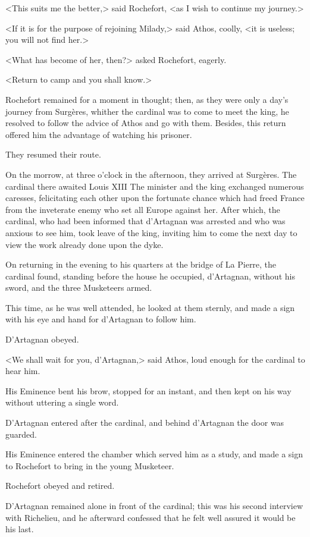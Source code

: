 <This suits me the better,> said Rochefort, <as I wish to continue my journey.> 

<If it is for the purpose of rejoining Milady,> said Athos, coolly, <it is useless; you will not find her.> 

<What has become of her, then?> asked Rochefort, eagerly. 

<Return to camp and you shall know.> 

Rochefort remained for a moment in thought; then, as they were only a day's journey from Surgères, whither the cardinal was to come to meet the king, he resolved to follow the advice of Athos and go with them. Besides, this return offered him the advantage of watching his prisoner. 

They resumed their route. 

On the morrow, at three o'clock in the afternoon, they arrived at Surgères. The cardinal there awaited Louis XIII The minister and the king exchanged numerous caresses, felicitating each other upon the fortunate chance which had freed France from the inveterate enemy who set all Europe against her. After which, the cardinal, who had been informed that d'Artagnan was arrested and who was anxious to see him, took leave of the king, inviting him to come the next day to view the work already done upon the dyke. 

On returning in the evening to his quarters at the bridge of La Pierre, the cardinal found, standing before the house he occupied, d'Artagnan, without his sword, and the three Musketeers armed. 

This time, as he was well attended, he looked at them sternly, and made a sign with his eye and hand for d'Artagnan to follow him. 

D'Artagnan obeyed. 

<We shall wait for you, d'Artagnan,> said Athos, loud enough for the cardinal to hear him. 

His Eminence bent his brow, stopped for an instant, and then kept on his way without uttering a single word. 

D'Artagnan entered after the cardinal, and behind d'Artagnan the door was guarded. 

His Eminence entered the chamber which served him as a study, and made a sign to Rochefort to bring in the young Musketeer. 

Rochefort obeyed and retired. 

D'Artagnan remained alone in front of the cardinal; this was his second interview with Richelieu, and he afterward confessed that he felt well assured it would be his last. 

